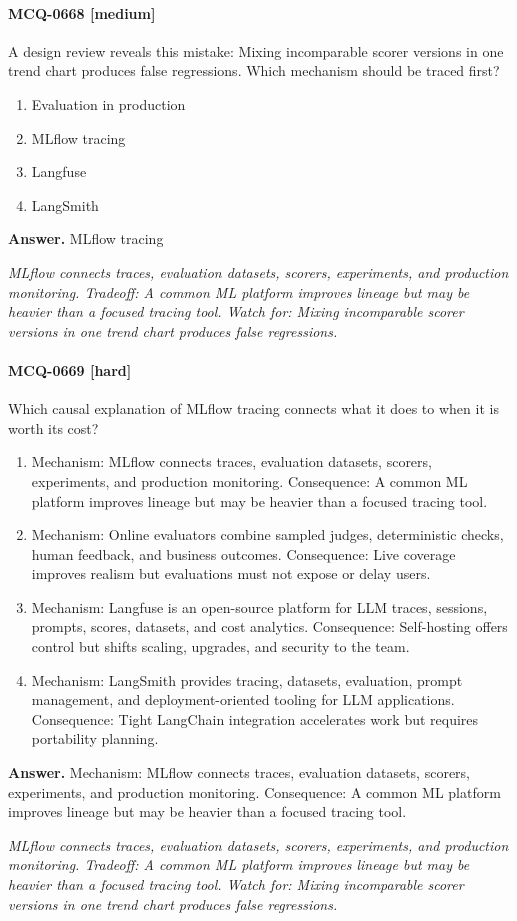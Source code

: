 \paragraph{MCQ-0668 [medium]} A design review reveals this mistake: Mixing incomparable scorer versions in one trend chart produces false regressions. Which mechanism should be traced first?
\begin{enumerate}[label=\Alph*.]
\item Evaluation in production
\item MLflow tracing
\item Langfuse
\item LangSmith
\end{enumerate}
\noindent\textbf{Answer.} MLflow tracing
\par\textit{MLflow connects traces, evaluation datasets, scorers, experiments, and production monitoring. Tradeoff: A common ML platform improves lineage but may be heavier than a focused tracing tool. Watch for: Mixing incomparable scorer versions in one trend chart produces false regressions.}
\paragraph{MCQ-0669 [hard]} Which causal explanation of MLflow tracing connects what it does to when it is worth its cost?
\begin{enumerate}[label=\Alph*.]
\item Mechanism: MLflow connects traces, evaluation datasets, scorers, experiments, and production monitoring. Consequence: A common ML platform improves lineage but may be heavier than a focused tracing tool.
\item Mechanism: Online evaluators combine sampled judges, deterministic checks, human feedback, and business outcomes. Consequence: Live coverage improves realism but evaluations must not expose or delay users.
\item Mechanism: Langfuse is an open-source platform for LLM traces, sessions, prompts, scores, datasets, and cost analytics. Consequence: Self-hosting offers control but shifts scaling, upgrades, and security to the team.
\item Mechanism: LangSmith provides tracing, datasets, evaluation, prompt management, and deployment-oriented tooling for LLM applications. Consequence: Tight LangChain integration accelerates work but requires portability planning.
\end{enumerate}
\noindent\textbf{Answer.} Mechanism: MLflow connects traces, evaluation datasets, scorers, experiments, and production monitoring. Consequence: A common ML platform improves lineage but may be heavier than a focused tracing tool.
\par\textit{MLflow connects traces, evaluation datasets, scorers, experiments, and production monitoring. Tradeoff: A common ML platform improves lineage but may be heavier than a focused tracing tool. Watch for: Mixing incomparable scorer versions in one trend chart produces false regressions.}
